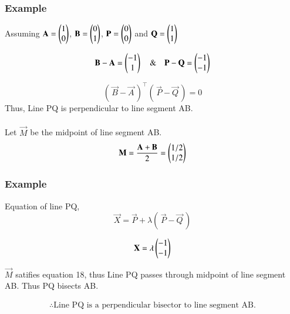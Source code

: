 \documentclass{beamer}
\begin{document}
\begin{frame}[fragile]
    \frametitle{Example}
Assuming $\mathbf{A} = \begin{pmatrix}1 \\ 0\end{pmatrix}$, $\mathbf{B} = \begin{pmatrix}0 \\ 1\end{pmatrix}$, $\mathbf{P} = \begin{pmatrix}0 \\ 0\end{pmatrix}$ and $\mathbf{Q} = \begin{pmatrix}1 \\ 1\end{pmatrix}$

\begin{equation}
    \mathbf{B} - \mathbf{A} = \begin{pmatrix}-1 \\ 1\end{pmatrix} \quad \& \quad \mathbf{P} - \mathbf{Q} = \begin{pmatrix}-1 \\ -1\end{pmatrix} 
\end{equation}


\begin{equation}
    (\, \vec{B} - \vec{A} \,)^\top(\, \vec{P} - \vec{Q} \,) = 0
\end{equation}
Thus, Line PQ is perpendicular to line segment AB.\\\\

Let $\vec{M}$ be the midpoint of line segment AB.
\begin{equation}
    \mathbf{M} = \dfrac{\mathbf{A}+\mathbf{B}}{2} = \begin{pmatrix}1/2 \\ 1/2\end{pmatrix}
\end{equation}
\end{frame}

\begin{frame}[fragile]
    \frametitle{Example}
Equation of line PQ,
\begin{equation}
    \vec{X} = \vec{P} + \lambda(\, \vec{P}-\vec{Q} \,)
\end{equation}

\begin{equation}
    \mathbf{X} = \lambda\begin{pmatrix}-1 \\ -1\end{pmatrix}
\end{equation}

$\vec{M}$ satifies equation 18, thus Line PQ passes through midpoint of line segment AB. Thus PQ bisects AB.

\begin{align*}
\therefore \text{Line PQ is a perpendicular bisector to line segment AB.}
\end{align*}
\end{frame}
\end{document}
